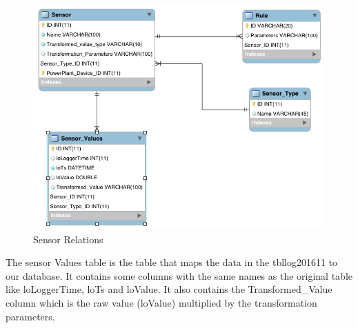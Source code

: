 \begin{figure}[H]
\centering
\includegraphics[scale=0.4]{Images/SensorRelations.png}
\caption[Sensor Relations]{Sensor Relations}
\end{figure}
The sensor Values table is the table that maps the data in the tbllog201611 to our database. It contains some columns with the same names as the original table like loLoggerTime, loTs and loValue. It also contains the Transformed\_Value column which is the raw value (loValue) multiplied by the transformation parameters.

